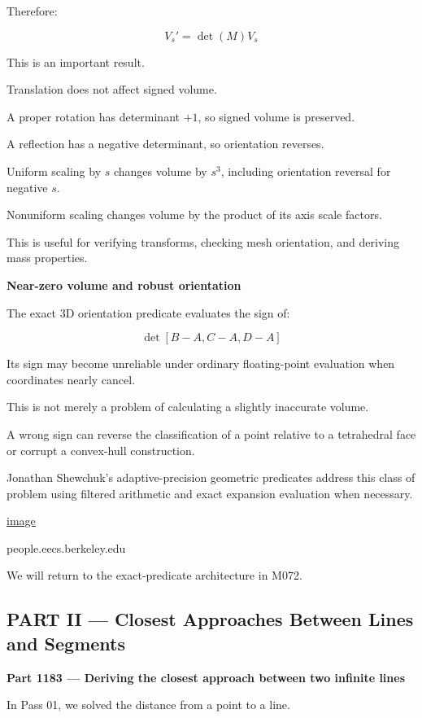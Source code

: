 Therefore:

\[
\boxed{ V_s'=\det(M)V_s }
\]

This is an important result.

Translation does not affect signed volume.

A proper rotation has determinant \(+1\), so signed volume is preserved.

A reflection has a negative determinant, so orientation reverses.

Uniform scaling by \(s\) changes volume by \(s^3\), including orientation reversal for negative \(s\).

Nonuniform scaling changes volume by the product of its axis scale factors.

This is useful for verifying transforms, checking mesh orientation, and deriving mass properties.

\textbf{Near-zero volume and robust orientation}

The exact 3D orientation predicate evaluates the sign of:

\[
\det[B-A,C-A,D-A]
\]

Its sign may become unreliable under ordinary floating-point evaluation when coordinates nearly cancel.

This is not merely a problem of calculating a slightly inaccurate volume.

A wrong sign can reverse the classification of a point relative to a tetrahedral face or corrupt a convex-hull construction.

Jonathan Shewchuk's adaptive-precision geometric predicates address this class of problem using filtered arithmetic and exact expansion evaluation when necessary. 

\href{https://www.google.com/s2/favicons?domain=https://people.eecs.berkeley.edu&sz=32}{image}

people.eecs.berkeley.edu

We will return to the exact-predicate architecture in M072.

\subsection{PART II --- Closest Approaches Between Lines and Segments}\label{04-visual-computing-ii-ch022-part-ii-closest-approaches-between-lines-and-segments}

\textbf{Part 1183 --- Deriving the closest approach between two infinite lines}

In Pass 01, we solved the distance from a point to a line.


